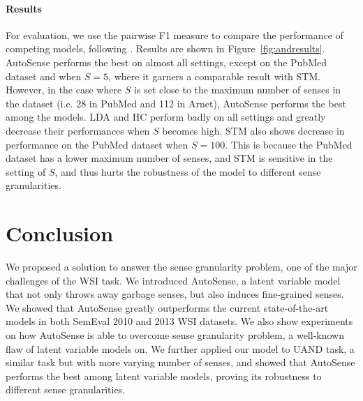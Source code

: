 \documentclass[letterpaper]{article} %
\begin{document}

\paragraph{Results}

For evaluation, we use the pairwise F1 measure to compare the performance of competing models, following \cite{tang2012unified}. Results are shown in Figure~\ref{fig:andresults}. AutoSense performs the best on almost all settings, except on the PubMed dataset and when $S=5$, where it garners a comparable result with STM. However, in the case where $S$ is set close to the maximum number of senses in the dataset (i.e. 28 in PubMed and 112 in Arnet), AutoSense performs the best among the models. LDA and HC perform badly on all settings and greatly decrease their performances when $S$ becomes high. STM also shows decrease in performance on the PubMed dataset when $S=100$. This is because the PubMed dataset has a lower maximum number of senses, and STM is sensitive in the setting of $S$, and thus hurts the robustness of the model to different sense granularities. 

\section{Conclusion} %

We proposed a solution to answer the sense granularity problem, one of the major challenges of the WSI task. We introduced AutoSense, a latent variable model that not only throws away garbage senses, but also induces fine-grained senses. We showed that AutoSense greatly outperforms the current state-of-the-art models in both SemEval 2010 and 2013 WSI datasets. We also show experiments on how AutoSense is able to overcome sense granularity problem, a well-known flaw of latent variable models on. We further applied our model to UAND task, a similar task but with more varying number of senses, and showed that AutoSense performs the best among latent variable models, proving its robustness to different sense granularities.
\end{document}
